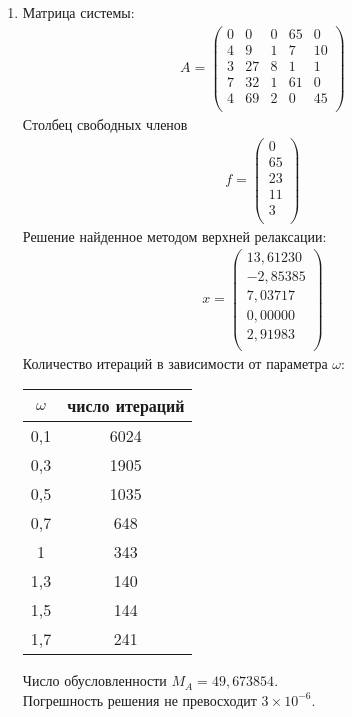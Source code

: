 \documentclass[a4paper,12pt,titlepage,finall]{article}
\begin{document}
\begin{enumerate}
\item
Матрица системы:
\begin{align*}
A = \begin{pmatrix}
0&     0&     0&    65&     0 \\
   4&     9&     1&     7&    10 \\
   3&    27&     8&     1&     1 \\
   7&    32&     1&    61&     0 \\
   4&    69&     2&     0&    45 \\
\end{pmatrix}
\end{align*}
Столбец свободных членов
\begin{align*}
f = \begin{pmatrix}
   0 \\
  65 \\
  23 \\
  11 \\
   3 \\
\end{pmatrix}
\end{align*}
Решение найденное методом верхней релаксации:
\begin{align*}
x = \begin{pmatrix}
13,61230 \\
  -2,85385 \\
   7,03717 \\
   0,00000 \\
   2,91983 \\
\end{pmatrix}
\end{align*}
Количество итераций в зависимости от параметра $\omega$:
\begin{center}
\begin{tabular}{|c|c|}
\hline
$\omega$ & число итераций\\
\hline
0,1 & 6024\\
0,3 & 1905\\
0,5 & 1035\\
0,7 & 648\\
 1 & 343\\
 1,3 & 140\\
 1,5 & 144\\
 1,7 & 241\\
 \hline
\end{tabular}
\end{center}

Число обусловленности $M_A = 49,673854$.\\
Погрешность решения не превосходит $3 \times 10^{-6}$.


\end{enumerate}
\end{document}
